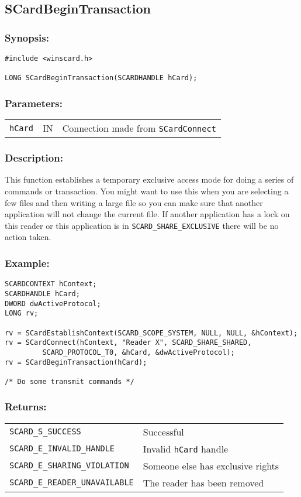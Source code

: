 \documentclass[a4paper,12pt]{article}
\newcommand{\synopsis}{\subsubsection{Synopsis:}}
\newcommand{\parameters}{\subsubsection{Parameters:}}
\newcommand{\desc}{\subsubsection{Description:}}
\newcommand{\example}{\subsubsection{Example:}}
\newcommand{\returns}{\subsubsection{Returns:}}
\begin{document}
\subsection{SCardBeginTransaction}

\synopsis
\begin{verbatim}
#include <winscard.h>

LONG SCardBeginTransaction(SCARDHANDLE hCard);
\end{verbatim}

\parameters

\begin{tabular}{lll}
\texttt{hCard} & IN & Connection made from \texttt{SCardConnect} \\
\end{tabular}

\desc

This function establishes a temporary exclusive access mode for doing a
series of commands or transaction.  You might want to use this when you
are selecting a few files and then writing a large file so you can make
sure that another application will not change the current file.  If
another application has a lock on this reader or this application is in
\texttt{SCARD\_SHARE\_EXCLUSIVE}  there will be no action taken.

\example

\begin{verbatim}
SCARDCONTEXT hContext;
SCARDHANDLE hCard;
DWORD dwActiveProtocol;
LONG rv;

rv = SCardEstablishContext(SCARD_SCOPE_SYSTEM, NULL, NULL, &hContext);
rv = SCardConnect(hContext, "Reader X", SCARD_SHARE_SHARED,
         SCARD_PROTOCOL_T0, &hCard, &dwActiveProtocol);
rv = SCardBeginTransaction(hCard);

/* Do some transmit commands */
\end{verbatim}

\returns

\begin{tabular}{ll}
\texttt{SCARD\_S\_SUCCESS}			& Successful\\
\texttt{SCARD\_E\_INVALID\_HANDLE}		& Invalid \texttt{hCard} handle\\
\texttt{SCARD\_E\_SHARING\_VIOLATION}	& Someone else has exclusive rights\\
\texttt{SCARD\_E\_READER\_UNAVAILABLE} 	& The reader has been removed\\
\end{tabular}
\end{document}
